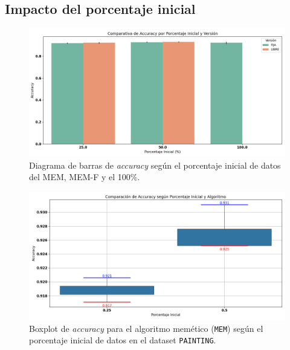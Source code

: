 \subsection{Impacto del porcentaje inicial}
\begin{figure}[htp]
    \centering
    \includegraphics[width=1\textwidth]{imagenes/evaluaciones/painting/comparacion-por-porcentaje}
    \caption{Diagrama de barras de \textit{accuracy} según el porcentaje inicial de datos del MEM, MEM-F y el 100\%.}
    \label{fig:accuracy_porcentaje_painting}
\end{figure}

\begin{figure}[htp]
    \centering
    \includegraphics[width=1\textwidth]{imagenes/evaluaciones/painting/comparacion-por-porcentaje-mem}
    \caption{Boxplot de \textit{accuracy} para el algoritmo memético (\texttt{MEM}) según el porcentaje inicial de datos en el dataset \texttt{PAINTING}.}
    \label{fig:comparacion-por-porcentaje-mem}
\end{figure}

